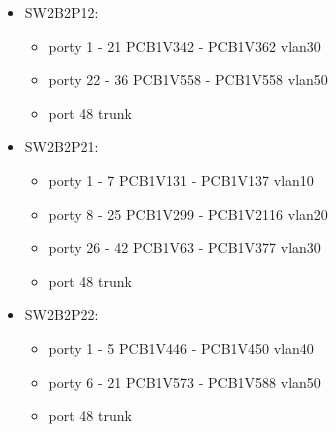 \documentclass[a4paper, 12pt]{article}
\begin{document}
\begin{itemize}
\item SW2B2P12:
	\begin{itemize}
	\item porty 1 - 21 PCB1V342 - PCB1V362 vlan30
	\item porty 22 - 36 PCB1V558 - PCB1V558 vlan50
	\item port 48 trunk
	\end{itemize}
	
\item SW2B2P21:
	\begin{itemize}
	\item porty 1 - 7 PCB1V131 - PCB1V137 vlan10
	\item porty 8 - 25 PCB1V299 - PCB1V2116 vlan20
	\item porty 26 - 42 PCB1V63 - PCB1V377 vlan30
	\item port 48 trunk
	\end{itemize}
	
\item SW2B2P22:
	\begin{itemize}
	\item porty 1 - 5 PCB1V446 - PCB1V450 vlan40
	\item porty 6 - 21 PCB1V573 - PCB1V588 vlan50
	\item port 48 trunk
	\end{itemize}

\end{itemize}
\end{document}
